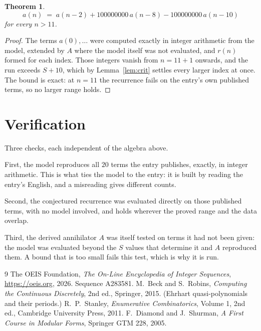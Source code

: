 \documentclass[11pt,a4paper]{article}
\theoremstyle{plain}
\newtheorem{theorem}{Theorem}
\theoremstyle{definition}
\begin{document}
\begin{theorem}
\[
a(n)\;=\;a(n-2) + 100000000\,a(n-8) - 100000000\,a(n-10)
\]
for every $n>11$.
\end{theorem}

\begin{proof}
The terms $a(0),\dots$ were computed exactly in integer arithmetic from the model, extended by
$A$ where the model itself was not evaluated, and $r(n)$ formed for each index. Those integers
vanish from $n=11+1$ onwards, and the run exceeds $S+10$, which by
Lemma~\ref{lem:crit} settles every larger index at once. The bound is exact: at $n=11$ the recurrence fails on the entry's own published terms, so no larger range holds.
\end{proof}

\section{Verification}

Three checks, each independent of the algebra above.

First, the model reproduces all $20$ terms the entry publishes, exactly, in integer
arithmetic. This is what ties the model to the entry: it is built by reading the entry's
English, and a misreading gives different counts.

Second, the conjectured recurrence was evaluated directly on those published terms, with no
model involved, and holds wherever the proved range and the data overlap.

Third, the derived annihilator $A$ was itself tested on terms it had not been given: the model
was evaluated beyond the $S$ values that determine it and $A$ reproduced them. A bound that is
too small fails this test, which is why it is run.

\begin{thebibliography}{9}
 The OEIS Foundation, \emph{The On-Line Encyclopedia of Integer
Sequences}, \url{https://oeis.org}, 2026. Sequence A283581.
 M.~Beck and S.~Robins, \emph{Computing the Continuous Discretely},
2nd ed., Springer, 2015. (Ehrhart quasi-polynomials and their periods.)
 R.~P.~Stanley, \emph{Enumerative Combinatorics}, Volume 1, 2nd ed.,
Cambridge University Press, 2011.
 F.~Diamond and J.~Shurman, \emph{A First Course in Modular Forms},
Springer GTM 228, 2005.
\end{thebibliography}
\end{document}
